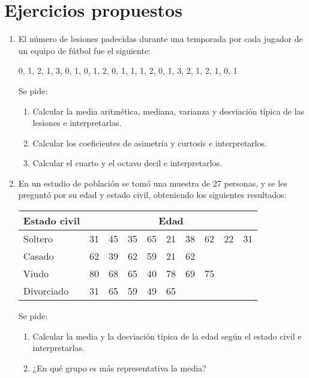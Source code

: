 \section{Ejercicios propuestos}
\begin{enumerate}[leftmargin=*]
\item  El número de lesiones padecidas durante una temporada por cada jugador de un equipo de fútbol fue el siguiente:
\begin{center}
0, 1, 2, 1, 3, 0, 1, 0, 1, 2, 0, 1, 1, 1, 2, 0, 1, 3, 2, 1, 2, 1, 0, 1
\end{center}

Se pide:
\begin{enumerate}
\item Calcular la media aritmética, mediana, varianza y desviación típica de las lesiones e interpretarlas.
\item Calcular los coeficientes de asimetría y curtosis e interpretarlos.
\item Calcular el cuarto y el octavo decil e interpretarlos.
\end{enumerate}

\item  En un estudio de población se tomó una muestra de 27 personas, y se les preguntó por su edad y estado civil,
obteniendo los siguientes resultados:
\begin{center}
\begin{tabular}{|l|rrrrrrrrr|}
\hline
Estado civil & \multicolumn{9}{c|}{Edad}\\
\hline
Soltero    & 31 & 45 & 35 & 65 & 21 & 38 & 62 & 22 & 31 \\
Casado     & 62 & 39 & 62 & 59 & 21 & 62 &    &    &    \\
Viudo      & 80 & 68 & 65 & 40 & 78 & 69 & 75 &    &    \\
Divorciado & 31 & 65 & 59 & 49 & 65 &    &    &    &    \\
\hline
\end{tabular}
\end{center}
Se pide:
\begin{enumerate}
\item Calcular la media y la desviación típica de la edad según el estado civil e interpretarlas.
\item ¿En qué grupo es más representativa la media?
\end{enumerate}


\end{enumerate}
